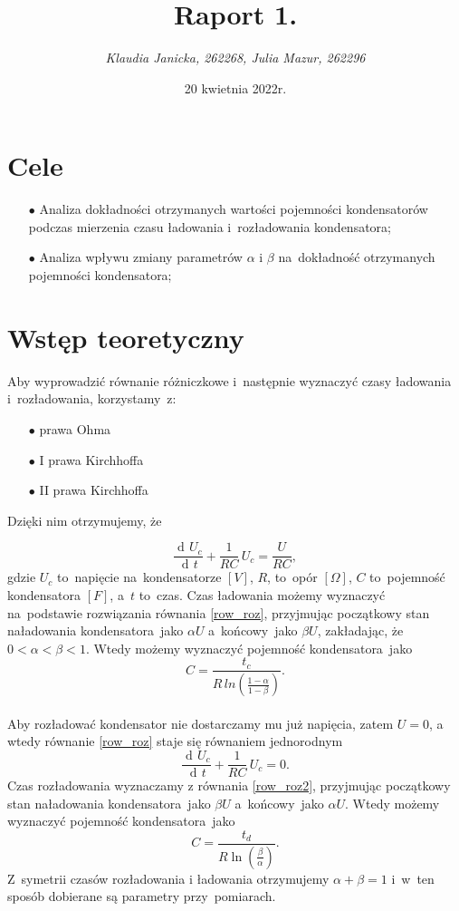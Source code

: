 \documentclass[12pt]{mwart}
\title{\textbf{Raport 1.}}
\author{\fontsize{12pt}{12pt}\selectfont \emph{Klaudia Janicka, 262268, Julia Mazur, 262296}}
\date{20 kwietnia 2022r.}
\DeclareMathOperator{\diff}{d\!}
\begin{document}
	\maketitle
	\section{Cele}
	\begin{itemize}
		\item[$\bullet$] Analiza dokładności otrzymanych wartości pojemności kondensatorów podczas mierzenia czasu ładowania i~rozładowania kondensatora;
		\item[$\bullet$] Analiza wpływu zmiany parametrów $\alpha$ i $\beta$ na~dokładność otrzymanych pojemności kondensatora;
	\end{itemize}
	\section{Wstęp teoretyczny}
	\noindent Aby wyprowadzić równanie różniczkowe i~następnie wyznaczyć czasy ładowania i~rozładowania, korzystamy~z:
	\begin{itemize}
		\item[$\bullet$] prawa Ohma
		\item[$\bullet$] I prawa Kirchhoffa
		\item[$\bullet$] II prawa Kirchhoffa
	\end{itemize}
	Dzięki nim otrzymujemy, że 
	
	\begin{equation}\label{row_roz}
		\frac{\diff U_{c}}{\diff t} +\frac{1}{RC}\, U_{c}=\frac{U}{RC},
	\end{equation}
	gdzie $U_{c}$ to~napięcie na~kondensatorze $\left[V\right]$, $R$, to~opór $\left[\Omega\right]$, $C$ to~pojemność kondensatora $\left[F\right]$, a~$t$ to~czas.
	Czas ładowania możemy wyznaczyć na~podstawie rozwiązania równania \eqref{row_roz}, przyjmując początkowy stan naładowania kondensatora~jako $\alpha U$ a~końcowy~jako $\beta U$, zakładając, że~$0 < \alpha < \beta < 1$. Wtedy możemy wyznaczyć pojemność kondensatora~jako $$C=\frac{t_{c}}{R\,ln\left(\frac{1-\alpha}{1-\beta}\right)}.$$\label{poj_lad}
	\phantom{a}\\
	Aby rozładować kondensator nie dostarczamy mu już napięcia, zatem $U = 0$, a wtedy równanie \eqref{row_roz} staje się równaniem jednorodnym
	\begin{equation}\label{row_roz2}
		\frac{\diff U_{c}}{\diff t} +\frac{1}{RC}\, U_{c}=0.
	\end{equation}
	Czas rozładowania wyznaczamy z równania \eqref{row_roz2}, przyjmując początkowy stan naładowania kondensatora~jako $\beta U$ a~końcowy~jako $\alpha U$. Wtedy możemy wyznaczyć pojemność kondensatora~jako
	$$C=\frac{t_d}{R\ln\left({\frac{\beta}{\alpha}}\right)}.$$
	Z~symetrii czasów rozładowania i ładowania otrzymujemy $\alpha+\beta=1$ i~w~ten sposób dobierane są parametry przy~pomiarach.
\end{document}
